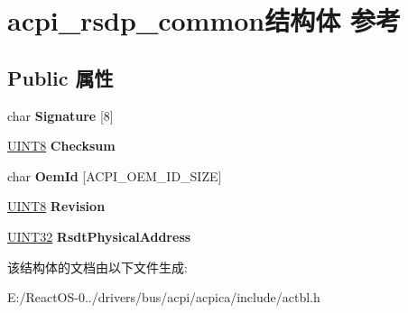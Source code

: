 \hypertarget{structacpi__rsdp__common}{}\section{acpi\+\_\+rsdp\+\_\+common结构体 参考}
\label{structacpi__rsdp__common}
\subsection*{Public 属性}
\begin{DoxyCompactItemize}
\item 
\mbox{\label{structacpi__rsdp__common_a9de791731765dad54aa5f29b396d4e3b}} 
char {\bfseries Signature} \mbox{[}8\mbox{]}
\item 
\mbox{\label{structacpi__rsdp__common_a84cfb16af09b5e516c32295ac3b95992}} 
\hyperlink{_processor_bind_8h_ab27e9918b538ce9d8ca692479b375b6a}{U\+I\+N\+T8} {\bfseries Checksum}
\item 
\mbox{\label{structacpi__rsdp__common_aa726be398c8ec7fc78ee3c17204dbd3a}} 
char {\bfseries Oem\+Id} \mbox{[}A\+C\+P\+I\+\_\+\+O\+E\+M\+\_\+\+I\+D\+\_\+\+S\+I\+ZE\mbox{]}
\item 
\mbox{\label{structacpi__rsdp__common_a4250389254fc326fa2b05c58a5efdf6f}} 
\hyperlink{_processor_bind_8h_ab27e9918b538ce9d8ca692479b375b6a}{U\+I\+N\+T8} {\bfseries Revision}
\item 
\mbox{\label{structacpi__rsdp__common_a64e96b78d0853da7fc4fbf23dea01f22}} 
\hyperlink{_processor_bind_8h_ae1e6edbbc26d6fbc71a90190d0266018}{U\+I\+N\+T32} {\bfseries Rsdt\+Physical\+Address}
\end{DoxyCompactItemize}


该结构体的文档由以下文件生成\+:\begin{DoxyCompactItemize}
\item 
E\+:/\+React\+O\+S-\/0../drivers/bus/acpi/acpica/include/actbl.\+h\end{DoxyCompactItemize}
